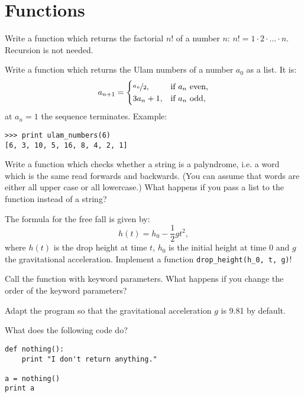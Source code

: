 \section*{Functions}
\begin{aufgabe}[Factorial]
\label{fakultaet}
Write a function which returns the factorial $n!$ of a number $n$: $n! = 1 \cdot 2 \cdot ... \cdot n$. Recursion is not needed.
\end{aufgabe}

\begin{aufgabe}
\label{ulamfolge}
Write a function which returns the Ulam numbers of a number $a_0$ as a list. It is: 
\begin{displaymath}
a_{n+1} =
\begin{cases}
\nicefrac{a_n}{2}, & \text{if } a_n \text{ even,}\\
3 a_n+1, & \text{if } a_n \text{ odd,}\\
\end{cases}
\end{displaymath}
 at $a_n=1$ the sequence terminates. 
Example: 
\begin{lstlisting}
>>> print ulam_numbers(6)
[6, 3, 10, 5, 16, 8, 4, 2, 1]
\end{lstlisting}
\end{aufgabe}

\begin{aufgabe}[Palindrome]
\label{palindrom}
Write a function which checks whether a string is a palyndrome, i.e. a word which is the same read forwards and backwards. (You can assume that words are either all upper case or all lowercase.) What happens if you pass a list to the function instead of a string?
\end{aufgabe}

\begin{aufgabe}
\label{freier_fall}
The formula for the free fall is given by:
\begin{displaymath}
h(t) = h_0 - \frac{1}{2} gt^2, 
\end{displaymath}
where $h(t)$ is the drop height at time $t$, $h_0$ is the initial height at time 0 and $g$ the gravitational acceleration. Implement a function \lstinline{drop_height(h_0, t, g)}!
\begin{teilaufgabe}
Call the function with keyword parameters. What happens if you change the order of the keyword parameters?
\end{teilaufgabe}
\begin{teilaufgabe}
Adapt the program so that the gravitational acceleration $g$ is 9.81 by default.
\end{teilaufgabe}
\end{aufgabe}

\begin{aufgabe}
What does the following code do?\\
\begin{lstlisting}
def nothing():
    print "I don't return anything."

a = nothing()
print a
\end{lstlisting}
\end{aufgabe}


